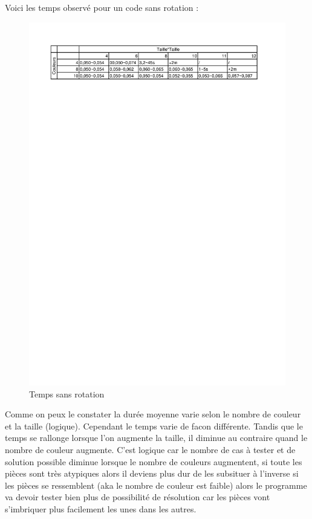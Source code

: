 \documentclass[12pt, openany]{report}
\begin{document}
Voici les temps observé pour un code sans rotation :
\begin{figure}
  \includegraphics[width=\linewidth]{img/TimeNR.png}
  \caption{Temps sans rotation}
  \label{img:timeNR}
\end{figure}
Comme on peux le constater la durée moyenne varie selon le nombre de couleur et la taille (logique). Cependant le temps varie de facon différente. Tandis que le temps se rallonge lorsque l'on augmente la taille, il diminue au contraire quand le nombre de couleur augmente. C'est logique car le nombre de cas à tester et de solution possible diminue lorsque le nombre de couleurs augmentent, si toute les pièces sont très atypiques alors il deviens plus dur de les subsituer à l'inverse si les pièces se ressemblent (aka le nombre de couleur est faible) alors le programme va devoir tester bien plus de possibilité de résolution car les pièces vont s'imbriquer plus facilement les unes dans les autres.
\end{document}
